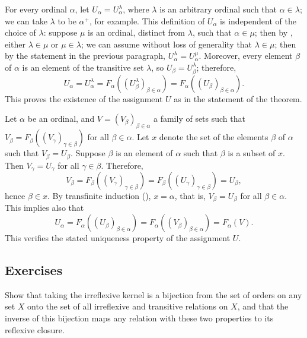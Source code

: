 \documentclass{article}
\begin{document}
For every ordinal \(\alpha\), let \(U_\alpha = U^\lambda_\alpha\),
where \(\lambda\) is an arbitrary ordinal such that
\(\alpha \in \lambda\); we can take \(\lambda\) to be \(\alpha^+\),
for example.  This definition of \(U_\alpha\) is independent of the
choice of \(\lambda\): suppose \(\mu\) is an ordinal, distinct from
\(\lambda\), such that \(\alpha \in \mu\); then by
, either \(\lambda \in \mu\) or
\(\mu \in \lambda\); we can assume without loss of generality that
\(\lambda \in \mu\); then by the statement in the previous paragraph,
\(U^\lambda_\alpha = U^\mu_\alpha\).  Moreover, every element
\(\beta\) of \(\alpha\) is an element of the transitive set
\(\lambda\), so \(U_\beta = U^\lambda_\beta\); therefore,
\begin{displaymath}
  U_\alpha = U^\lambda_\alpha =
  F_\alpha((U^\lambda_\beta)_{\beta \in \alpha}) =
  F_\alpha((U_\beta)_{\beta \in \alpha}).
\end{displaymath}
This proves the existence of the assignment \(U\) as in the statement
of the theorem.

Let \(\alpha\) be an ordinal, and \(V = (V_\beta)_{\beta \in \alpha}\)
a family of sets such that
\(V_\beta = F_\beta((V_\gamma)_{\gamma \in \beta})\) for all
\(\beta \in \alpha\).  Let \(x\) denote the set of the elements
\(\beta\) of \(\alpha\) such that \(V_\beta = U_\beta\).  Suppose
\(\beta\) is an element of \(\alpha\) such that \(\beta\) is a subset
of \(x\).  Then \(V_\gamma = U_\gamma\) for all \(\gamma \in \beta\).
Therefore,
\begin{displaymath}
  V_\beta = F_\beta((V_\gamma)_{\gamma \in \beta}) =
  F_\beta((U_\gamma)_{\gamma \in \beta}) = U_\beta,
\end{displaymath}
hence \(\beta \in x\).  By transfinite induction
(), \(x = \alpha\), that is, \(V_\beta = U_\beta\)
for all \(\beta \in \alpha\).  This implies also that
\begin{displaymath}
  U_\alpha = F_\alpha((U_\beta)_{\beta \in \alpha}) =
  F_\alpha((V_\beta)_{\beta \in \alpha}) = F_\alpha(V).
\end{displaymath}
This verifies the stated uniqueness property of the assignment \(U\).

\subsection{Exercises}
\label{sec:q1c2w2jy}

\begin{exercise}
  \label{exe:eydusvz3}
  Show that taking the irreflexive kernel is a bijection from the set
  of orders on any set \(X\) onto the set of all irreflexive and
  transitive relations on \(X\), and that the inverse of this
  bijection maps any relation with these two properties to its
  reflexive closure.
\end{exercise}
\end{document}
